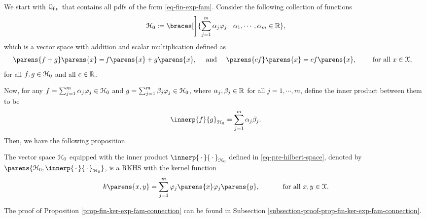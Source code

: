 We start with $\mathcal{Q}_{\mathrm{fin}}$ that contains all pdfs of the form \eqref{eq-fin-exp-fam}. Consider the following collection of functions 
\begin{align*}
	\calH_{0} := \braces[\Bigg]{\sum_{j=1}^m \alpha_j \varphi_j \Bigm| \alpha_1, \cdots, \alpha_m \in \Real}, 
\end{align*}
which is a vector space with addition and scalar multiplication defined as 
\begin{align*}
	\parens{f + g} \parens{x} = & \, f \parens{x} + g \parens{x}, \quad \text{ and } \quad \parens{c f} \parens{x} = c f \parens{x}, \qquad \text{ for all } x \in \calX, 
\end{align*}
for all $f, g \in \mathcal{H}_0$ and all $c \in \mathbb{R}$. 

Now, for any $f = \sum_{j=1}^m \alpha_j \varphi_j \in \mathcal{H}_0$ and $g = \sum_{j=1}^m \beta_j \varphi_j \in \mathcal{H}_0$, where $\alpha_j, \beta_j \in \mathbb{R}$ for all $j = 1, \cdots, m$, define the inner product between them to be 
\begin{align}\label{eq-pre-hilbert-space}
	\innerp{f}{g}_{\calH_0} = \sum_{j=1}^m \alpha_{j} \beta_{j}. 
\end{align}
Then, we have the following proposition. 

\begin{proposition}\label{prop-fin-ker-exp-fam-connection}
	The vector space $\mathcal{H}_{0}$ equipped with the inner product $\innerp{\,\cdot\,}{\,\cdot\,}_{\calH_0}$ defined in \eqref{eq-pre-hilbert-space}, denoted by $\parens{\calH_0, \innerp{\,\cdot\,}{\,\cdot\,}_{\calH_0}}$, is a RKHS with the kernel function 
	\begin{align}\label{eq-m-dim-exp-fam-rk}
		k \parens{x, y} = \sum_{j=1}^m \varphi_j \parens{x} \varphi_j \parens{y}, \qquad \quad \text{ for all } x, y \in \calX. 
	\end{align}
\end{proposition}

The proof of Proposition \ref{prop-fin-ker-exp-fam-connection} can be found in Subsection \ref{subsection-proof-prop-fin-ker-exp-fam-connection}. 

